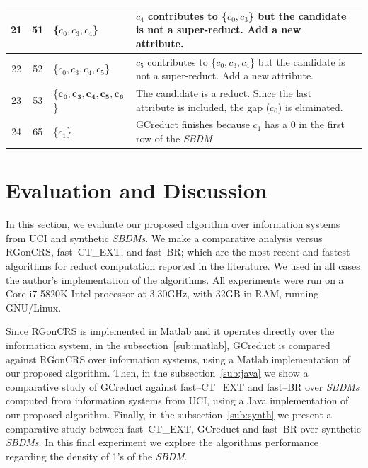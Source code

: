 \documentclass[number,preprint,review,12pt]{elsarticle}
\begin{document}
\begin{table}[!htb]
\begin{tabular}{|c|c|l|l|l|}
				\hline		
		21 & 51 & \{$c_0,c_3,c_4$\}			& \multicolumn{1}{p{8.5cm}|}{$c_4$ contributes to \{$c_0,c_3$\} but the candidate is not a super-reduct. Add a new attribute.}\\
				\hline
		22 & 52 & \{$c_0,c_3,c_4,c_5$\}		& \multicolumn{1}{p{8.5cm}|}{$c_5$ contributes to \{$c_0,c_3,c_4$\} but the candidate is not a super-reduct. Add a new attribute.}\\
				\hline
		23 & 53 & \{$\mathbf{c_0,c_3,c_4,c_5,c_6}$\} & \multicolumn{1}{p{8.5cm}|}{The candidate is a reduct. Since the last attribute is included, the gap ($c_0$) is eliminated.}\\
				\hline
		24 & 65 & \{$c_1$\} 				& \multicolumn{1}{p{8.5cm}|}{GCreduct finishes because $c_1$ has a 0 in the first row of the \textit{SBDM}} \\ %
		\hline
	\end{tabular}
\end{table}
	
%
\section{Evaluation and Discussion}\label{evaluation}
	In this section, we evaluate our proposed algorithm over information systems from UCI \citep{Bache13} and synthetic \textit{SBDMs}. We make a comparative analysis versus RGonCRS, fast--CT\_EXT, and fast--BR; which are the most recent and fastest algorithms for reduct computation reported in the literature. We used in all cases the author's implementation of the algorithms. All experiments were run on a Core i7-5820K Intel processor at 3.30GHz, with 32GB in RAM, running GNU/Linux.
	
	Since RGonCRS is implemented in Matlab and it operates directly	over the information system, in the subsection~\ref{sub:matlab}, GCreduct is compared against RGonCRS over information systems, using a Matlab implementation of our proposed algorithm. Then, in the subsection~\ref{sub:java} we show a comparative study of GCreduct against fast--CT\_EXT and fast--BR over \textit{SBDMs} computed from information systems from UCI, using a Java implementation of our proposed algorithm. Finally, in the subsection~\ref{sub:synth} we present a comparative study between fast--CT\_EXT, GCreduct and fast--BR over synthetic \textit{SBDMs}. In this final experiment we explore the algorithms performance regarding the density of 1's of the \textit{SBDM}.
	
\end{document}
